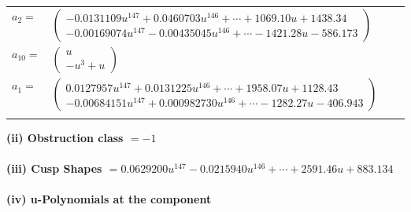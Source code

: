 \documentclass[1p]{elsarticle_modified}
\theoremstyle{definition}
\begin{document}
\begin{tabular}{m{7pt} m{180pt} m{7pt} m{180pt} }
\flushright $a_{2}=$&$\begin{pmatrix}-0.0131109 u^{147}+0.0460703 u^{146}+\cdots+1069.10 u+1438.34\\-0.00169074 u^{147}-0.00435045 u^{146}+\cdots-1421.28 u-586.173\end{pmatrix}$ \\
\flushright $a_{10}=$&$\begin{pmatrix}u\\- u^3+u\end{pmatrix}$ \\
\flushright $a_{1}=$&$\begin{pmatrix}0.0127957 u^{147}+0.0131225 u^{146}+\cdots+1958.07 u+1128.43\\-0.00684151 u^{147}+0.000982730 u^{146}+\cdots-1282.27 u-406.943\end{pmatrix}$\\&\end{tabular}
\flushleft \textbf{(ii) Obstruction class $= -1$}\\~\\
\flushleft \textbf{(iii) Cusp Shapes $= 0.0629200 u^{147}-0.0215940 u^{146}+\cdots+2591.46 u+883.134$}\\~\\
\newpage\renewcommand{\arraystretch}{1}
\flushleft \textbf{(iv) u-Polynomials at the component}\newline \\
\end{document}
